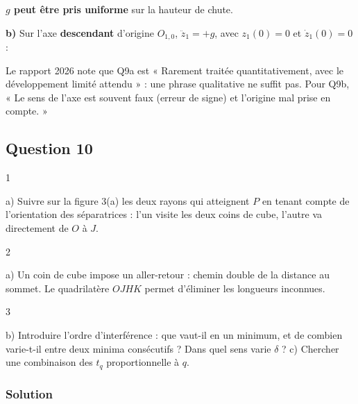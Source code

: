 \documentclass[11pt,a4paper]{article}
\newcommand{\equationajustee}[1]{%
  \sbox{\boiteequation}{$\displaystyle #1$}%
  \ifdim\wd\boiteequation>\linewidth
    \[\resizebox{\linewidth}{!}{\usebox{\boiteequation}}\]%
  \else
    \[#1\]%
  \fi}
\begin{document}
\equationajustee{\frac{g(h)-g(0)}{g(0)}\approx-\frac{2h}{R_T}\approx-3\cdot10^{-7}.}

\textbf{\(g\) peut être pris uniforme} sur la hauteur de chute.

\textbf{b)} Sur l'axe \textbf{descendant} d'origine \(O_{1,0}\), \(\ddot z_1=+g\), avec \(z_1(0)=0\) et \(\dot z_1(0)=0\) :

\equationajustee{\boxed{z_1(t)=\frac12gt^2}}

\begin{jury}

Le rapport 2026 note que Q9a est « Rarement traitée quantitativement, avec le développement limité attendu » : une phrase qualitative ne suffit pas. Pour Q9b, « Le sens de l'axe est souvent faux (erreur de signe) et l'origine mal prise en compte. »

\end{jury}

\hypertarget{question-10}{%
\subsection{Question 10}\label{question-10}}

\begin{indication}{1}

a) Suivre sur la figure 3(a) les deux rayons qui atteignent \(P\) en tenant compte de l'orientation des séparatrices : l'un visite les deux coins de cube, l'autre va directement de \(O\) à \(J\).

\end{indication}

\begin{indication}{2}

a) Un coin de cube impose un aller-retour : chemin double de la distance au sommet. Le quadrilatère \(OJHK\) permet d'éliminer les longueurs inconnues.

\end{indication}

\begin{indication}{3}

b) Introduire l'ordre d'interférence : que vaut-il en un minimum, et de combien varie-t-il entre deux minima consécutifs ? Dans quel sens varie \(\delta\) ? c) Chercher une combinaison des \(t_q\) proportionnelle à \(q\).

\end{indication}

\hypertarget{solution-9}{%
\subsubsection{Solution}\label{solution-9}}
\end{document}
